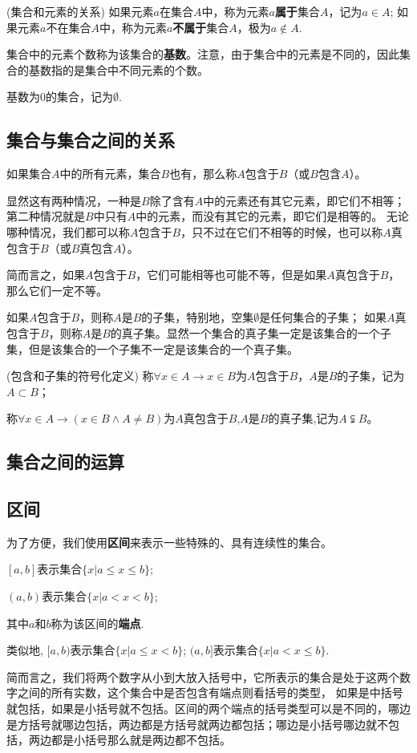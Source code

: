 \begin{definition}(集合和元素的关系)
    如果元素$a$在集合$A$中，称为元素$a$\textbf{属于}集合$A$，记为$a \in A$;
    如果元素$a$不在集合$A$中，称为元素$a$\textbf{不属于}集合$A$，极为$a \notin A$. 
\end{definition}

集合中的元素个数称为该集合的\textbf{基数}。注意，由于集合中的元素是不同的，因此集合的基数指的是集合中不同元素的个数。

基数为0的集合，记为$\emptyset$.

\subsection{集合与集合之间的关系}
如果集合$A$中的所有元素，集合$B$也有，那么称$A$包含于$B$（或$B$包含$A$）。

显然这有两种情况，一种是$B$除了含有$A$中的元素还有其它元素，即它们不相等；
第二种情况就是$B$中只有$A$中的元素，而没有其它的元素，即它们是相等的。
无论哪种情况，我们都可以称$A$包含于$B$，只不过在它们不相等的时候，也可以称$A$真包含于$B$（或$B$真包含$A$）。

简而言之，如果$A$包含于$B$，它们可能相等也可能不等，但是如果$A$真包含于$B$，那么它们一定不等。

如果$A$包含于$B$，则称$A$是$B$的子集，特别地，空集$\emptyset$是任何集合的子集；
如果$A$真包含于$B$，则称$A$是$B$的真子集。显然一个集合的真子集一定是该集合的一个子集，但是该集合的一个子集不一定是该集合的一个真子集。

\begin{definition}(包含和子集的符号化定义)
    称$\forall x \in A \to x \in B $为$A$包含于$B$，$A$是$B$的子集，记为$A \subset B$；

    称$\forall x  \in A \to (x \in B \wedge A \neq B)$为$A$真包含于$B$,$A$是$B$的真子集,记为$A \subsetneqq B$。
\end{definition}

\subsection{集合之间的运算}

\subsection{区间}
为了方便，我们使用\textbf{区间}来表示一些特殊的、具有连续性的集合。
\begin{definition}
    $[a,b]$表示集合$\{x| a \leq  x \leq b\}$;
    
    $(a,b)$表示集合$\{x| a<x<b\}$;

    其中$a$和$b$称为该区间的\textbf{端点}.

    类似地,
    $[a,b)$表示集合$\{x| a \leq x <b\}$;
    $(a,b]$表示集合$\{x| a < x \leq b\}$.
\end{definition}
简而言之，我们将两个数字从小到大放入括号中，它所表示的集合是处于这两个数字之间的所有实数，这个集合中是否包含有端点则看括号的类型，
如果是中括号就包括，如果是小括号就不包括。区间的两个端点的括号类型可以是不同的，哪边是方括号就哪边包括，两边都是方括号就两边都包括；哪边是小括号哪边就不包括，两边都是小括号那么就是两边都不包括。

